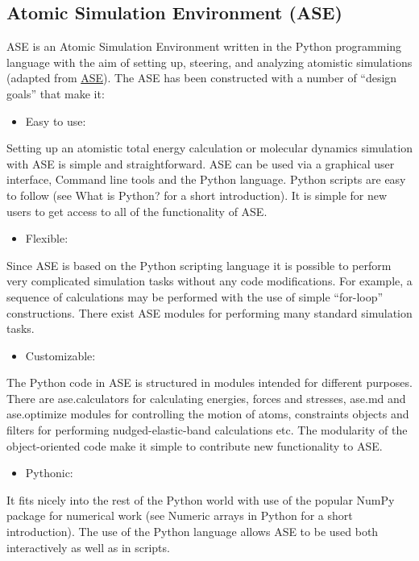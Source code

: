 \documentclass[11pt]{article}
\begin{document}
\subsection{Atomic Simulation Environment (ASE)}
\label{sec:org6294a4d}
ASE is an Atomic Simulation Environment written in the Python programming language with the aim of setting up, steering, and analyzing atomistic simulations (adapted from \href{https://wiki.fysik.dtu.dk/ase/about.html}{ASE}). The ASE has been constructed with a number of “design goals” that make it:

\begin{itemize}
\item Easy to use:
\end{itemize}
Setting up an atomistic total energy calculation or molecular dynamics simulation with ASE is simple and straightforward. ASE can be used via a graphical user interface, Command line tools and the Python language. Python scripts are easy to follow (see What is Python? for a short introduction). It is simple for new users to get access to all of the functionality of ASE.

\begin{itemize}
\item Flexible:
\end{itemize}
Since ASE is based on the Python scripting language it is possible to perform very complicated simulation tasks without any code modifications. For example, a sequence of calculations may be performed with the use of simple “for-loop” constructions. There exist ASE modules for performing many standard simulation tasks.

\begin{itemize}
\item Customizable:
\end{itemize}
The Python code in ASE is structured in modules intended for different purposes. There are ase.calculators for calculating energies, forces and stresses, ase.md and ase.optimize modules for controlling the motion of atoms, constraints objects and filters for performing nudged-elastic-band calculations etc. The modularity of the object-oriented code make it simple to contribute new functionality to ASE.

\begin{itemize}
\item Pythonic:
\end{itemize}
It fits nicely into the rest of the Python world with use of the popular NumPy package for numerical work (see Numeric arrays in Python for a short introduction). The use of the Python language allows ASE to be used both interactively as well as in scripts.
\end{document}
